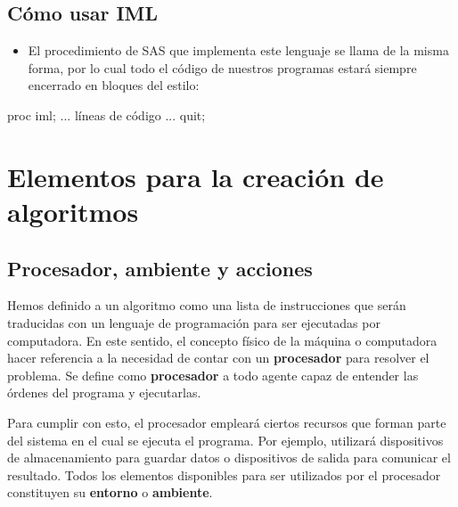 \documentclass[
]{book}
\newenvironment{Shaded}{\begin{snugshade}}{\end{snugshade}}
\newcommand{\NormalTok}[1]{#1}
\providecommand{\tightlist}{%
  \setlength{\itemsep}{0pt}\setlength{\parskip}{0pt}}
\begin{document}
\hypertarget{cuxf3mo-usar-iml}{%
\section{Cómo usar IML}\label{cuxf3mo-usar-iml}}

\begin{itemize}
\tightlist
\item
  El procedimiento de SAS que implementa este lenguaje se llama de la misma forma, por lo cual todo el código de nuestros programas estará siempre encerrado en bloques del estilo:
\end{itemize}

\begin{Shaded}
\begin{Highlighting}[]
\NormalTok{proc iml;}
\NormalTok{    ...}
\NormalTok{    líneas de código}
\NormalTok{    ...}
\NormalTok{quit;}
\end{Highlighting}
\end{Shaded}

\hypertarget{elementos-para-la-creaciuxf3n-de-algoritmos}{%
\chapter{Elementos para la creación de algoritmos}\label{elementos-para-la-creaciuxf3n-de-algoritmos}}

\hypertarget{procesador-ambiente-y-acciones}{%
\section{Procesador, ambiente y acciones}\label{procesador-ambiente-y-acciones}}

Hemos definido a un algoritmo como una lista de instrucciones que serán traducidas con un lenguaje de programación para ser ejecutadas por computadora. En este sentido, el concepto físico de la máquina o computadora hacer referencia a la necesidad de contar con un \textbf{procesador} para resolver el problema. Se define como \textbf{procesador} a todo agente capaz de entender las órdenes del programa y ejecutarlas.

Para cumplir con esto, el procesador empleará ciertos recursos que forman parte del sistema en el cual se ejecuta el programa. Por ejemplo, utilizará dispositivos de almacenamiento para guardar datos o dispositivos de salida para comunicar el resultado. Todos los elementos disponibles para ser utilizados por el procesador constituyen su \textbf{entorno} o \textbf{ambiente}.
\end{document}
